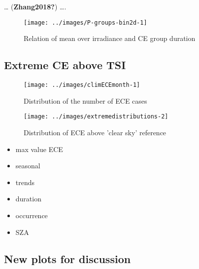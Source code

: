\documentclass[
]{article}
\providecommand{\tightlist}{%
  \setlength{\itemsep}{0pt}\setlength{\parskip}{0pt}}
\begin{document}
\ldots{} (\textbf{Zhang2018?}) \ldots.

\begin{figure}[h!]

{\centering \texttt{[image: ../images/P-groups-bin2d-1]} 

}

\caption{Relation of mean over irradiance and CE group duration}\label{fig:unnamed-chunk-3}
\end{figure}

\FloatBarrier

\hypertarget{extreme-ce-above-tsi}{%
\subsection{Extreme CE above TSI}\label{extreme-ce-above-tsi}}

\begin{figure}[h!]

{\centering \texttt{[image: ../images/climECEmonth-1]} 

}

\caption{Distribution of the number of ECE cases}\label{fig:unnamed-chunk-4}
\end{figure}

\begin{figure}[h!]

{\centering \texttt{[image: ../images/extremedistributions-2]} 

}

\caption{Distribution of ECE above 'clear sky' reference}\label{fig:unnamed-chunk-5}
\end{figure}

\begin{itemize}
\tightlist
\item
  max value ECE
\item
  seasonal
\item
  trends
\item
  duration
\item
  occurrence
\item
  SZA
\end{itemize}

\FloatBarrier

\hypertarget{new-plots-for-discussion}{%
\subsection{New plots for discussion}\label{new-plots-for-discussion}}
\end{document}
